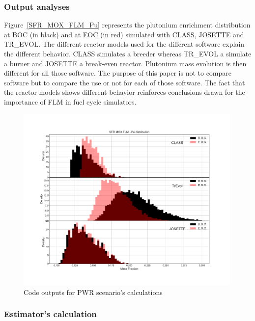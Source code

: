 \subsubsection{Output analyses}

Figure~\ref{SFR_MOX_FLM_Pu} represents the plutonium enrichment distribution at
BOC (in black) and at EOC (in red) simulated with CLASS, JOSETTE and TR\_EVOL.
The different reactor models used for the different software explain the
different behavior. CLASS simulates a breeder whereas TR\_EVOL a simulate a
burner and JOSETTE a break-even reactor. Plutonium mass evolution is then
different for all those software. The purpose of this paper is not to compare
software but to compare the use or not for each of those software. The fact that
the reactor models shows different behavior reinforces conclusions drawn for the
importance of \gls{FLM} in fuel cycle simulators.     

\begin{figure}[h]
	\begin{center}
		\includegraphics[width = 0.99\textwidth]{../../Feature_1/RAW_DATA/FIG/SFR_MOX_FLM_Pu.pdf}
		\caption{Code outputs for \gls{PWR} scenario's calculations}
		\label{fig:SFR_MOX_FLM_Pu}
	\end{center}
\end{figure}

\subsubsection{Estimator's calculation}
